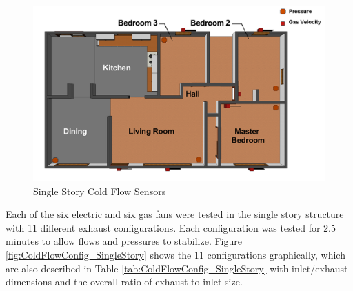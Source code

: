 \documentclass{article}
\begin{document}
\begin{figure} [H]
	\centering
	\includegraphics[width = 5in]{0_Images/ColdFlow/SingleStory_Sensors.png}
	\caption{Single Story Cold Flow Sensors}
	\label{fig:SingleStoryColdFlowSensors}
\end{figure}

Each of the six electric and six gas fans were tested in the single story structure with 11 different exhaust configurations. Each configuration was tested for 2.5 minutes to allow flows and pressures to stabilize. Figure \ref{fig:ColdFlowConfig_SingleStory} shows the 11 configurations graphically, which are also described in Table \ref{tab:ColdFlowConfig_SingleStory} with inlet/exhaust dimensions and the overall ratio of exhaust to inlet size. 
\end{document}
